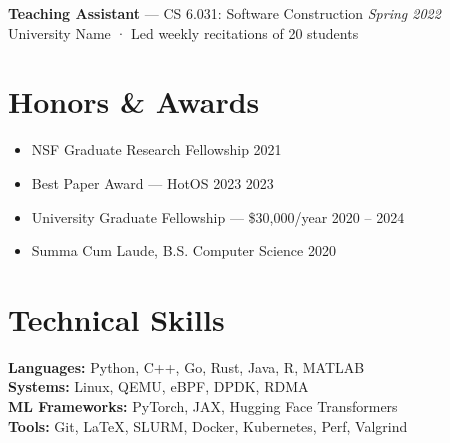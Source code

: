 \documentclass[11pt, a4paper]{article}
\begin{document}
\vspace{5pt}
\noindent\textbf{Teaching Assistant} — CS 6.031: Software Construction \hfill \textit{Spring 2022}\\
University Name · Led weekly recitations of 20 students

\section{Honors \& Awards}

\begin{itemize}[leftmargin=*, noitemsep, topsep=2pt]
  \item NSF Graduate Research Fellowship \hfill 2021
  \item Best Paper Award — HotOS 2023 \hfill 2023
  \item University Graduate Fellowship — \$30,000/year \hfill 2020 -- 2024
  \item Summa Cum Laude, B.S. Computer Science \hfill 2020
\end{itemize}

\section{Technical Skills}

\noindent\textbf{Languages:} Python, C++, Go, Rust, Java, R, MATLAB\\
\textbf{Systems:} Linux, QEMU, eBPF, DPDK, RDMA\\
\textbf{ML Frameworks:} PyTorch, JAX, Hugging Face Transformers\\
\textbf{Tools:} Git, LaTeX, SLURM, Docker, Kubernetes, Perf, Valgrind
\end{document}

